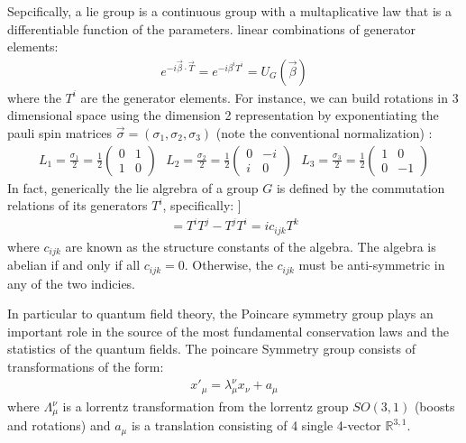 Sepcifically, a lie group is a continuous group with a multaplicative law that is a differentiable function of the parameters. linear combinations of generator elements:
\begin{align*}
e^{-i\vec \beta \cdot \vec T} = e^{-i\beta^i T^i} = U_{G}(\vec \beta)
\end{align*}
where the $T^i$ are the generator elements. 
For instance, we can build rotations in 3 dimensional space 
using the dimension 2 representation by exponentiating the pauli spin matrices $\vec \sigma = (\sigma_1, \sigma_2, \sigma_3)$ 
(note the conventional normalization) :
\begin{align*}
L_1 = \frac{\sigma_1}{2} = \frac{1}{2} \begin{pmatrix} 0 & 1 \\ 1 & 0 \end{pmatrix} \text{  }
L_2 = \frac{\sigma_2}{2} = \frac{1}{2} \begin{pmatrix} 0 & -i \\ i & 0 \end{pmatrix} \text{  } 
L_3 = \frac{\sigma_3}{2} =  \frac{1}{2} \begin{pmatrix} 1 & 0 \\ 0 & -1 \end{pmatrix} 
\end{align*}
In fact, generically the lie algrebra of a group $G$ is defined by the commutation relations of its generators $T^i$, 
specifically:
]\begin{align*}
[T^i, T^j] = T^iT^j - T^jT^i=  i c_{ijk} T^k
\end{align*}
where $c_{ijk}$ are known as the structure constants of the algebra. The algebra is abelian 
if and only if all $c_{ijk}=0$. Otherwise, the $c_{ijk}$ must be anti-symmetric in any of the two indicies. 

In particular to quantum field theory, the Poincare symmetry group plays an important role in the 
source of the most fundamental conservation laws and the statistics of the quantum fields. 
The poincare Symmetry group consists of transformations of the form:
\begin{align*}
x'_\mu = \lambda^\nu_\mu x_\nu + a_\mu 
\end{align*}
where $\Lambda^\nu_\mu$ is a lorrentz transformation from the lorrentz group $SO(3,1)$ (boosts and rotations) and 
$a_\mu$ is a translation consisting of 4 single 4-vector $\mathbb{R}^{3,1}$. 

